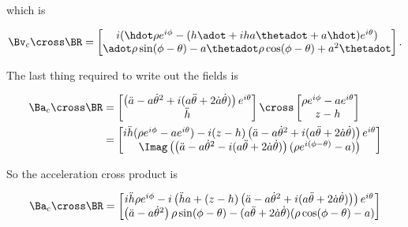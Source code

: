 {which is

\begin{equation}\label{eqn:relativisticElectrodynamicsExamReflection:970}
\Bv_c \cross \BR 
=
\begin{bmatrix}
i( \hdot \rho e^{i\phi} - (h \adot + i h a \thetadot + a \hdot) e^{i\theta} ) \\
\adot \rho \sin(\phi - \theta) - a \thetadot \rho \cos(\phi - \theta) + a^2 \thetadot
\end{bmatrix}.
\end{equation}

The last thing required to write out the fields is

\begin{equation}\label{eqn:relativisticElectrodynamicsExamReflection:1330}
\begin{aligned}
\Ba_c \cross \BR 
&=
\begin{bmatrix}
\left( \ddot{a} - a {\dot{\theta}}^2 + i ( a\ddot{\theta} + 2 \dot{a} \dot{\theta} ) \right) e^{i\theta} \\
\ddot{h}
\end{bmatrix}
\cross
\begin{bmatrix}
\rho e^{i\phi} - a e^{i\theta} \\
z - h
\end{bmatrix} \\
&=
\begin{bmatrix}
i \ddot{h} (\rho e^{i\phi} - a e^{i\theta} ) - i (z - h) \left( \ddot{a} - a {\dot{\theta}}^2 + i ( a\ddot{\theta} + 2 \dot{a} \dot{\theta} ) \right) e^{i\theta} \\
\Imag \left( 
\left( \ddot{a} - a {\dot{\theta}}^2 - i ( a\ddot{\theta} + 2 \dot{a} \dot{\theta} ) \right) ( \rho e^{i(\phi -\theta)} - a )
\right)
\end{bmatrix} \\
\end{aligned}
\end{equation}

So the acceleration cross product is

\begin{equation}\label{eqn:relativisticElectrodynamicsExamReflection:980}
\Ba_c \cross \BR 
=
\begin{bmatrix}
i \ddot{h} \rho e^{i\phi} 
- i \left( \ddot{h} a + (z - h) \left( \ddot{a} - a {\dot{\theta}}^2 + i ( a\ddot{\theta} + 2 \dot{a} \dot{\theta} ) \right) \right) e^{i\theta} \\
\left( \ddot{a} - a {\dot{\theta}}^2 \right) \rho \sin(\phi - \theta)
-( a\ddot{\theta} + 2 \dot{a} \dot{\theta} ) (\rho \cos(\phi -\theta) - a)
\end{bmatrix}
\end{equation}

}
